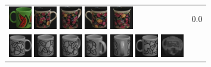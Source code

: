{\begin{figure}[p]
\begin{tabular}{m{11cm} | m{3cm} |}
\includegraphics[width=1cm]{coil/beeld-31.eps}
\includegraphics[width=1cm]{coil/beeld-60.eps}
\includegraphics[width=1cm]{coil/beeld-63.eps}
\includegraphics[width=1cm]{coil/beeld-61.eps}
\includegraphics[width=1cm]{coil/beeld-62.eps}
& {\scriptsize 0.0}
\\
\includegraphics[width=1cm]{coil/beeld-48.eps}
\includegraphics[width=1cm]{coil/beeld-50.eps}
\includegraphics[width=1cm]{coil/beeld-51.eps}
\includegraphics[width=1cm]{coil/beeld-52.eps}
\includegraphics[width=1cm]{coil/beeld-53.eps}
\includegraphics[width=1cm]{coil/beeld-49.eps}
\includegraphics[width=1cm]{coil/beeld-29.eps}

\end{tabular}
\end{figure}}
